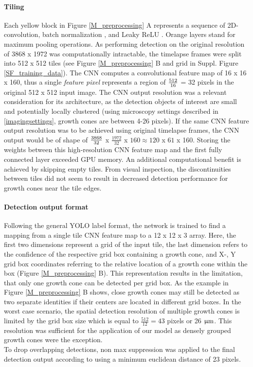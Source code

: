 \paragraph{Tiling}
Each yellow block in Figure \ref{M_preprocessing} A represents a sequence of
2D-convolution, batch normalization \parencite{BN}, and Leaky ReLU
\parencite{leakyrelu}. Orange layers stand for maximum pooling operations. As
performing detection on the original resolution of 3868 x 1972 was
computationally intractable, the timelapse frames were split into 512 x 512
tiles (see Figure \ref{M_preprocessing} B and grid in Suppl. Figure
\ref{SF_training_data}). The CNN computes a convolutional feature map of 16 x 16
x 160, thus a single \textit{feature pixel} represents a region of $\rm
\frac{512}{16}$ = 32 pixels in the original 512 x 512 input image. The CNN
output resolution was a relevant consideration for its architecture, as the
detection objects of interest are small and potentially locally clustered (using
microscopy settings described in \ref{imagingsettings}, growth cones are between
4-26 pixels). If the same CNN feature output resolution was to be achieved using
original timelapse frames, the CNN output would be of shape of $\rm
\frac{3868}{32}$ x $\frac{1972}{32}$ x $160 \approx 120$ x $61$ x 160. Storing
the weights between this high-resolution CNN feature map and the first fully
connected layer exceeded  
GPU memory. An additional computational benefit is achieved by skipping empty
tiles. From visual inspection, the discontinuities between tiles did not seem to
result in decreased detection performance for growth cones near the tile edges. 

\paragraph{Detection output format}
Following the general YOLO label format, the network is trained to find a
mapping from a single tile CNN feature map to a 12 x 12 x 3 array. Here, the
first two dimensions represent a grid of the input tile, the last dimension
refers to the confidence of the respective grid box containing a growth cone,
and X-, Y grid box coordinates referring to the relative location of a growth
cone within the box (Figure \ref{M_preprocessing} B). This representation
results in the limitation, that only one growth cone can be detected per grid
box. As the example in Figure \ref{M_preprocessing} B shows, close growth cones
may still be detected as two separate identities if their centers are located in
different grid boxes. In the worst case scenario, the spatial detection
resolution of multiple growth cones is limited by the grid box size which is
equal to $\frac{512}{12} = 43$  pixels or 26 $\rm \upmu m$. This resolution was
sufficient for the application of our model as densely grouped growth cones were
the exception. \\
To drop overlapping detections, non max suppression was applied to the final
detection output according to \parencite{nms} using a minimum euclidean distance
of 23 pixels.

